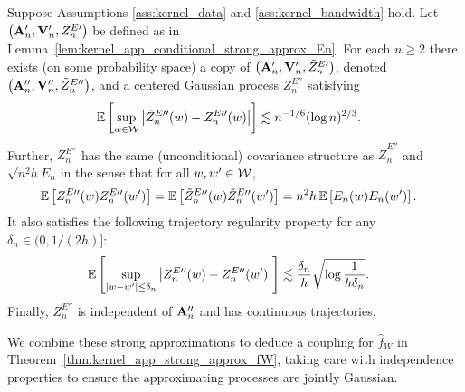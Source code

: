 \begin{lemma}
  \label{lem:kernel_app_unconditional_strong_approx_En}

  Suppose Assumptions
  \ref{ass:kernel_data} and \ref{ass:kernel_bandwidth} hold.
  Let $\big(\mathbf{A}_n', \mathbf{V}_n', \tilde Z_n^{E\prime}\big)$
  be defined as in
  Lemma~\ref{lem:kernel_app_conditional_strong_approx_En}.
  For each $n \geq 2$
  there exists
  (on some probability space)
  a copy of
  $\big(\mathbf{A}_n', \mathbf{V}_n', \tilde Z_n^{E\prime}\big)$,
  denoted
  $\big(\mathbf{A}_n'', \mathbf{V}_n'', \tilde Z_n^{E\prime\prime}\big)$,
  and a centered
  Gaussian process
  $Z^{E\dprime}_n$
  satisfying
  \begin{align*}
    \mathbb{E}\left[
      \sup_{w \in \mathcal{W}}
      \big|\tilde Z_n^{E\prime\prime}(w) - Z_n^{E\prime\prime}(w)\big|
    \right]
    &\lesssim
    n^{-1/6} (\log n)^{2/3}.
  \end{align*}
  Further,
  $Z_n^{E\dprime}$ has the same
  (unconditional) covariance structure as
  $\tilde Z_n^{E\dprime}$ and $\sqrt{n^2h} E_n$
  in the sense that for all $w, w' \in \mathcal{W}$,
  \begin{align*}
    \mathbb{E}\left[
      Z_n^{E\prime\prime}(w)
      Z_n^{E\prime\prime}(w')
    \right]
    &=
    \mathbb{E}\left[
      \tilde Z_n^{E\prime\prime}(w)
      \tilde Z_n^{E\prime\prime}(w')
    \right]
    =
    n^2h \,
    \mathbb{E}\left[
      E_n(w)
      E_n(w')
    \right].
  \end{align*}
  It also satisfies the following
  trajectory regularity property
  for any $\delta_n \in (0, 1/(2h)]$:
  \begin{align*}
    \mathbb{E}\left[
      \sup_{|w-w'| \leq \delta_n}
      \big|
      Z_n^{E\prime\prime}(w)
      - Z_n^{E\prime\prime}(w')
      \big|
    \right]
    &\lesssim
    \frac{\delta_n}{h}
    \sqrt{\log \frac{1}{h\delta_n}}.
  \end{align*}
  Finally, $Z_n^{E\dprime}$ is independent of $\mathbf{A}_n''$
  and has continuous trajectories.

\end{lemma}

We combine these strong approximations to deduce a coupling for $\hat f_W$ in
Theorem~\ref{thm:kernel_app_strong_approx_fW}, taking care with independence
properties to ensure the approximating processes are jointly Gaussian.

